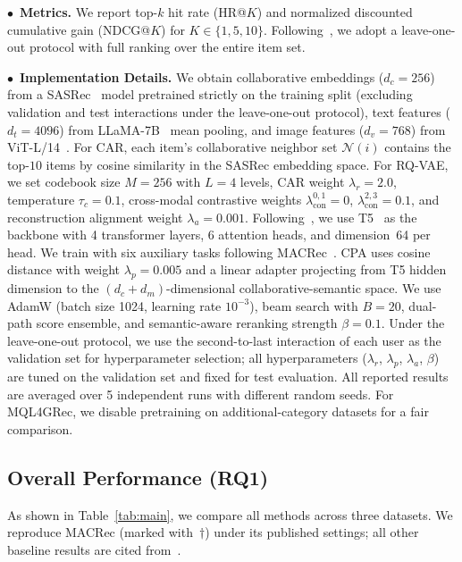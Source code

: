 \documentclass[sigconf, anonymous, review]{acmart}
\begin{document}
\noindent$\bullet$~\textbf{Metrics.}
We report top-$k$ hit rate (HR@$K$) and normalized discounted cumulative gain (NDCG@$K$) for $K \in \{1, 5, 10\}$.
% 
Following~\citet{p5,hua2023index}, we adopt a leave-one-out protocol with full ranking over the entire item set.

\noindent$\bullet$~\textbf{Implementation Details.}
We obtain collaborative embeddings ($d_c\!=\!256$) from a SASRec~\cite{sasrec} model pretrained strictly on the training split (excluding validation and test interactions under the leave-one-out protocol), text features ($d_t\!=\!4096$) from LLaMA-7B~\cite{touvron2023llama} mean pooling, and image features ($d_v\!=\!768$) from ViT-L/14~\cite{clip}.
% 
For CAR, each item's collaborative neighbor set $\mathcal{N}(i)$ contains the top-$10$ items by cosine similarity in the SASRec embedding space.
%
For RQ-VAE, we set codebook size $M\!=\!256$ with $L\!=\!4$ levels, CAR weight $\lambda_r\!=\!2.0$, temperature $\tau_c\!=\!0.1$, cross-modal contrastive weights $\lambda_{\text{con}}^{0,1}\!=\!0$, $\lambda_{\text{con}}^{2,3}\!=\!0.1$, and reconstruction alignment weight $\lambda_a\!=\!0.001$.
% 
Following~\citet{tiger,mql}, we use T5~\cite{t5} as the backbone with 4 transformer layers, 6 attention heads, and dimension~64 per head.
% 
We train with six auxiliary tasks following MACRec~\cite{macrec}.
% 
CPA uses cosine distance with weight $\lambda_p\!=\!0.005$ and a linear adapter projecting from T5 hidden dimension to the $(d_c\!+\!d_m)$-dimensional collaborative-semantic space.
% 
We use AdamW (batch size 1024, learning rate $10^{-3}$), beam search with $B\!=\!20$, dual-path score ensemble, and semantic-aware reranking strength $\beta\!=\!0.1$.
%
Under the leave-one-out protocol, we use the second-to-last interaction of each user as the validation set for hyperparameter selection; all hyperparameters ($\lambda_r$, $\lambda_p$, $\lambda_a$, $\beta$) are tuned on the validation set and fixed for test evaluation.
%
All reported results are averaged over 5 independent runs with different random seeds.
% 
For MQL4GRec, we disable pretraining on additional-category datasets for a fair comparison.

\subsection{Overall Performance (RQ1)}
\label{sec:rq1}

As shown in Table~\ref{tab:main}, we compare all methods across three datasets.
%
We reproduce MACRec (marked with~$\dagger$) under its published settings; all other baseline results are cited from~\cite{macrec}.
\end{document}
